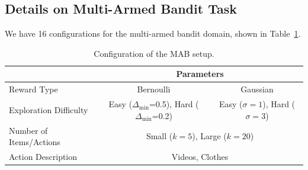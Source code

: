 \documentclass[11pt, logo]{googledeepmind}
\theoremstyle{plain}
\theoremstyle{definition}
\begin{document}
\subsection{Details on Multi-Armed Bandit Task}
\label{app_subsec: mab}
We have 16 configurations for the multi-armed bandit domain, shown in Table~\ref{tab:mab_config}.
\begin{table}[h]
\centering
\small
\begin{tabular}{@{}l|cc@{}}
\toprule
                        & \multicolumn{2}{c}{Parameters}                                    \\ \midrule
Reward Type             & \multicolumn{1}{c|}{Bernoulli}              & Gaussian            \\ \midrule
Exploration Difficulty  & \multicolumn{1}{c|}{Easy ($\Delta_{\min}$=0.5), Hard ($\Delta_{\min}$=0.2)} & Easy ($\sigma=1$), Hard ($\sigma=3$) \\ \midrule
Number of Items/Actions & \multicolumn{2}{c}{Small ($k=5$), Large ($k=20$)}                         \\ \midrule
Action Description & \multicolumn{2}{c}{Videos, Clothes}                               \\ \bottomrule
\end{tabular}
\vspace{2mm}
\caption{Configuration of the MAB setup. }
\label{tab:mab_config}
\end{table}
\end{document}
